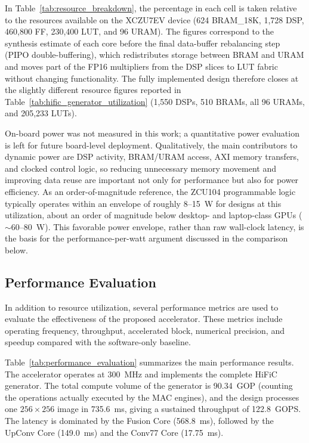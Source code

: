 In Table~\ref{tab:resource_breakdown}, the percentage in each cell is taken relative to the resources available on the XCZU7EV device (624 BRAM\_18K, 1{,}728 DSP, 460{,}800 FF, 230{,}400 LUT, and 96 URAM). The figures correspond to the synthesis estimate of each core before the final data-buffer rebalancing step (PIPO double-buffering), which redistributes storage between BRAM and URAM and moves part of the FP16 multipliers from the DSP slices to LUT fabric without changing functionality. The fully implemented design therefore closes at the slightly different resource figures reported in Table~\ref{tab:hific_generator_utilization} (1,550 DSPs, 510 BRAMs, all 96 URAMs, and 205,233 LUTs).

On-board power was not measured in this work; a quantitative power evaluation is left for future board-level deployment. Qualitatively, the main contributors to dynamic power are DSP activity, BRAM/URAM access, AXI memory transfers, and clocked control logic, so reducing unnecessary memory movement and improving data reuse are important not only for performance but also for power efficiency. As an order-of-magnitude reference, the ZCU104 programmable logic typically operates within an envelope of roughly 8--15~W for designs at this utilization, about an order of magnitude below desktop- and laptop-class GPUs ($\sim$60--80~W). This favorable power envelope, rather than raw wall-clock latency, is the basis for the performance-per-watt argument discussed in the comparison below.

\subsection{Performance Evaluation}

In addition to resource utilization, several performance metrics are used to evaluate the effectiveness of the proposed accelerator. These metrics include operating frequency, throughput, accelerated block, numerical precision, and speedup compared with the software-only baseline.

Table~\ref{tab:performance_evaluation} summarizes the main performance results. The accelerator operates at 300~MHz and implements the complete HiFiC generator. The total compute volume of the generator is 90.34~GOP (counting the operations actually executed by the MAC engines), and the design processes one $256\times256$ image in 735.6~ms, giving a sustained throughput of 122.8~GOPS. The latency is dominated by the Fusion Core (568.8~ms), followed by the UpConv Core (149.0~ms) and the Conv77 Core (17.75~ms).

